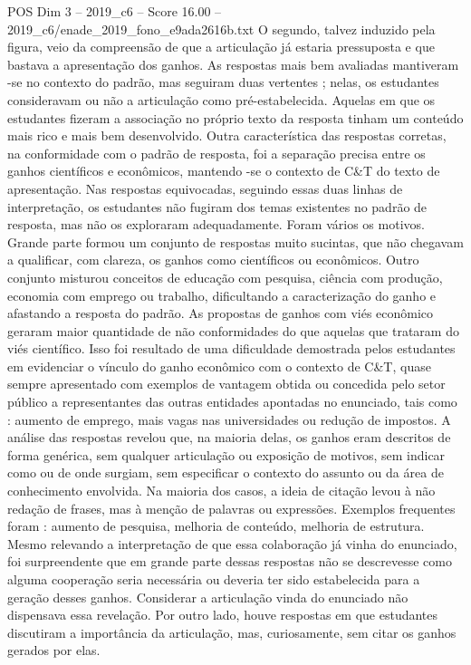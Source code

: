 \begin{textsample}{POS Dim 3 – 2019\_c6 – Score 16.00 – 2019\_c6/enade\_2019\_fono\_e9ada2616b.txt}
O segundo, talvez induzido pela figura, veio da compreensão de que a articulação já estaria pressuposta e que bastava a apresentação dos ganhos.
As respostas mais bem avaliadas mantiveram -se no contexto do padrão, mas seguiram duas vertentes ; nelas, os estudantes consideravam ou não a articulação como pré-estabelecida.
Aquelas em que os estudantes fizeram a associação no próprio texto da resposta tinham um conteúdo mais rico e mais bem desenvolvido.
Outra característica das respostas corretas, na conformidade com o padrão de resposta, foi a separação precisa entre os ganhos científicos e econômicos, mantendo -se o contexto de C\&T do texto de apresentação.
Nas respostas equivocadas, seguindo essas duas linhas de interpretação, os estudantes não fugiram dos temas existentes no padrão de resposta, mas não os exploraram adequadamente.
Foram vários os motivos.
Grande parte formou um conjunto de respostas muito sucintas, que não chegavam a qualificar, com clareza, os ganhos como científicos ou econômicos.
Outro conjunto misturou conceitos de educação com pesquisa, ciência com produção, economia com emprego ou trabalho, dificultando a caracterização do ganho e afastando a resposta do padrão.
As propostas de ganhos com viés econômico geraram maior quantidade de não conformidades do que aquelas que trataram do viés científico.
Isso foi resultado de uma dificuldade demostrada pelos estudantes em evidenciar o vínculo do ganho econômico com o contexto de C\&T, quase sempre apresentado com exemplos de vantagem obtida ou concedida pelo setor público a representantes das outras entidades apontadas no enunciado, tais como : aumento de emprego, mais vagas nas universidades ou redução de impostos.
A análise das respostas revelou que, na maioria delas, os ganhos eram descritos de forma genérica, sem qualquer articulação ou exposição de motivos, sem indicar como ou de onde surgiam, sem especificar o contexto do assunto ou da área de conhecimento envolvida.
Na maioria dos casos, a ideia de citação levou à não redação de frases, mas à menção de palavras ou expressões.
Exemplos frequentes foram : aumento de pesquisa, melhoria de conteúdo, melhoria de estrutura.
Mesmo relevando a interpretação de que essa colaboração já vinha do enunciado, foi surpreendente que em grande parte dessas respostas não se descrevesse como alguma cooperação seria necessária ou deveria ter sido estabelecida para a geração desses ganhos.
Considerar a articulação vinda do enunciado não dispensava essa revelação.
Por outro lado, houve respostas em que estudantes discutiram a importância da articulação, mas, curiosamente, sem citar os ganhos gerados por elas.

\end{textsample}
